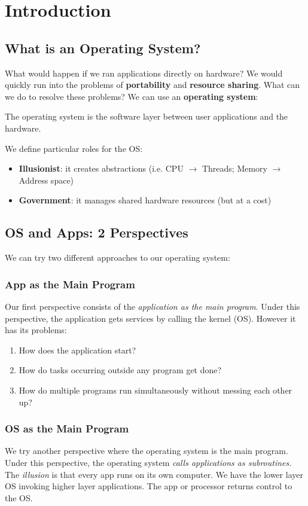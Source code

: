 \chapter{Introduction}
\section{What is an Operating System?}
What would happen if we ran applications directly on hardware? We would quickly run into the problems of \textbf{portability} and \textbf{resource sharing}. What can we do to resolve these problems? We can use an \textbf{operating system}:
\begin{definition}
	The operating system is the software layer between user applications and the hardware.
\end{definition}

We define particular roles for the OS:
\begin{itemize}
	\item \textbf{Illusionist}: it creates abstractions (i.e. CPU \(\to\) Threads; Memory \(\to\) Address space)
	\item \textbf{Government}: it manages shared hardware resources (but at a cost)
\end{itemize}

\section{OS and Apps: 2 Perspectives}
We can try two different approaches to our operating system:

\subsection{App as the Main Program}
Our first perspective consists of the \emph{application as the main program}. Under this perspective, the application gets services by calling the kernel (OS). However it has its problems:

\begin{enumerate}[label=\roman*.]
	\item How does the application start?
	\item How do tasks occurring outside any program get done?
	\item How do multiple programs run simultaneously without messing each other up?
\end{enumerate}

\subsection{OS as the Main Program}
We try another perspective where the operating system is the main program. Under this perspective, the operating system \emph{calls applications as subroutines}. The \emph{illusion} is that every app runs on its own computer. We have the lower layer OS invoking higher layer applications. The app or processor returns control to the OS.

